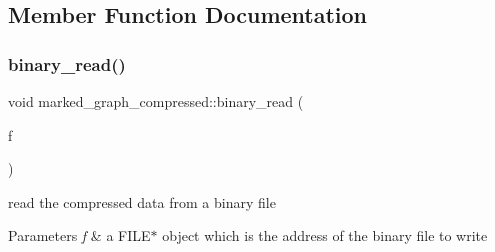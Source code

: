 \subsection{Member Function Documentation}
\mbox{\label{classmarked__graph__compressed_a9db2d11bd63ad3d5a75e47b4023a89dd}} 
\subsubsection{\texorpdfstring{binary\+\_\+read()}{binary\_read()}}
{\footnotesize\ttfamily void marked\+\_\+graph\+\_\+compressed\+::binary\+\_\+read (\begin{DoxyParamCaption}\item[{F\+I\+LE $\ast$}]{f }\end{DoxyParamCaption})}



read the compressed data from a binary file 


\begin{DoxyParams}{Parameters}
{\em f} & a {\ttfamily F\+I\+L\+E$\ast$} object which is the address of the binary file to write \\
\hline
\end{DoxyParams}

